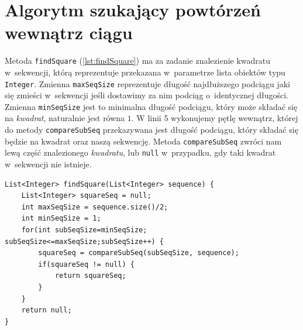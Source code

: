 \documentclass[document]{xmgr}
\begin{document}
\section{Algorytm szukający powtórzeń wewnątrz ciągu}






Metoda \texttt{findSquare} (\ref{lst:findSquare}) ma za zadanie znalezienie kwadratu w~sekwencji, którą reprezentuje przekazana w~parametrze lista obiektów typu \texttt{Integer}. Zmienna \mbox{\texttt{maxSeqSize}} reprezentuje długość najdłuższego podciągu jaki się zmieści w~sekwencji jeśli dostawimy za nim podciąg o~identycznej długości. Zmienna \mbox{\texttt{minSeqSize}} jest to minimalna długość podciągu, który może składać się na \emph{kwadrat}, naturalnie jest równa $1$. W linii 5 wykonujemy pętlę wewnątrz, której do metody \texttt{compareSubSeq} przekazywana jest długość podciągu, który składać się będzie na kwadrat oraz naszą sekwencję. Metoda \texttt{compareSubSeq} zwróci nam lewą część znalezionego \emph{kwadratu}, lub \texttt{null} w~przypadku, gdy taki kwadrat w~sekwencji nie istnieje.

\begin{lstlisting}[caption={Metoda szukająca \emph{kwadratów} wewnątrz listy.},label=lst:findSquare]
List<Integer> findSquare(List<Integer> sequence) {
	List<Integer> squareSeq = null;
	int maxSeqSize = sequence.size()/2;
	int minSeqSize = 1;
	for(int subSeqSize=minSeqSize; subSeqSize<=maxSeqSize;subSeqSize++) {
		squareSeq = compareSubSeq(subSeqSize, sequence);
		if(squareSeq != null) {
			return squareSeq;
		}
	}
	return null;
}
\end{lstlisting}
\end{document}

